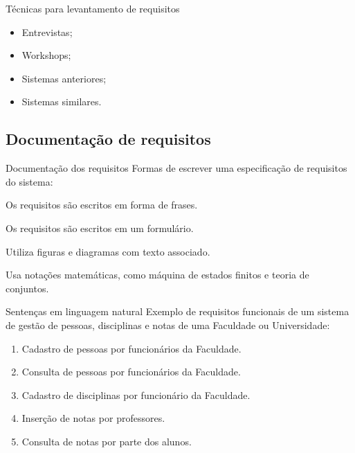 \begin{frame}{Técnicas para levantamento de requisitos}
  \begin{itemize}[<+->]
  \item Entrevistas;
  \item Workshops;
  \item Sistemas anteriores;
  \item Sistemas similares.
  \end{itemize}
\end{frame}


\subsection{Documentação de requisitos}

\begin{frame}{Documentação dos requisitos}
  Formas de escrever uma especificação de requisitos do sistema:

  \begin{description}[<+->]
  \item[Sentenças em linguagem natural:] Os requisitos são escritos em forma de frases.
  \item[Linguagem natural estruturada:] Os requisitos são escritos em um formulário.
    \item[Notações gráficas:] Utiliza figuras e diagramas com texto associado.
  \item[Especificações matemáticas:] Usa notações matemáticas, como máquina de estados 
    finitos e teoria de conjuntos.
  \end{description}
\end{frame}

\begin{frame}{Sentenças em linguagem natural}
  Exemplo de requisitos funcionais de um sistema de gestão de pessoas, disciplinas e notas 
  de uma Faculdade ou Universidade:
  \begin{enumerate}
  \item Cadastro de pessoas por funcionários da Faculdade.
    \item Consulta de pessoas por funcionários da Faculdade.
    \item Cadastro de disciplinas por funcionário da Faculdade. 
    \item Inserção de notas por professores.
    \item Consulta de notas por parte dos alunos.
    \end{enumerate}
\end{frame}

